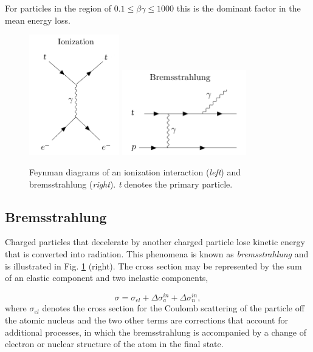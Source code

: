 For particles in the region of $0.1 \leq \beta \gamma \leq 1000$ this is the dominant factor in the mean energy loss. 

\begin{figure}
\centering
\includegraphics[width = 0.35\textwidth]{chapter4/img/Feynman_Ionization_2.png}
\includegraphics[width = 0.48\textwidth]{chapter4/img/Feynman_Bremsstrahlung_2.png}
\caption{Feynman diagrams of an ionization interaction (\textit{left}) and bremsstrahlung (\textit{right}). \textit{t} denotes the primary particle.}
\label{fig:feynmanionizbrems}
\end{figure}


\subsection{Bremsstrahlung}
Charged particles that decelerate by another charged particle lose kinetic energy that is converted into radiation. This phenomena is known as \textit{bremsstrahlung} and is illustrated in Fig. \ref{fig:feynmanionizbrems} (right). The cross section may be represented by the sum of an elastic component and two inelastic components,

\begin{equation}
\sigma = \sigma_{el} + \Delta \sigma^{in}_a + \Delta \sigma^{in}_n,
\end{equation}
where $\sigma_{el}$ denotes the cross section for the Coulomb scattering of the particle off the atomic nucleus and the two other terms are corrections that account for additional processes, in which the bremsstrahlung is accompanied by a change of electron or nuclear structure of the atom in the final state.

